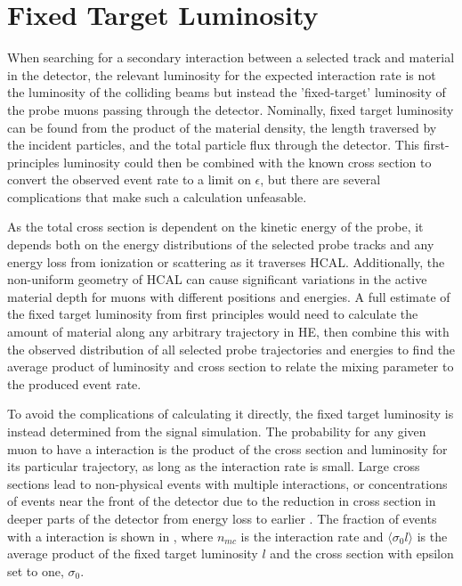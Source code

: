 \section{Fixed Target Luminosity}
\label{sec:fixedLumi}
When searching for a secondary interaction between a selected track and material in the detector, the relevant luminosity for the expected interaction rate is not the luminosity of the colliding beams but instead the 'fixed-target' luminosity of the probe muons passing through the detector.
Nominally, fixed target luminosity can be found from the product of the material density, the length traversed by the incident particles, and the total particle flux through the detector.
This first-principles luminosity could then be combined with the known \dbrem cross section to convert the observed event rate to a limit on $\epsilon$, but there are several complications that make such a calculation unfeasable.

As the total cross section is dependent on the kinetic energy of the probe, it depends both on the energy distributions of the selected probe tracks and any energy loss from ionization or scattering as it traverses HCAL.
Additionally, the non-uniform geometry of HCAL can cause significant variations in the active material depth for muons with different positions and energies. 
A full estimate of the fixed target luminosity from first principles would need to calculate the amount of material along any arbitrary trajectory in HE, then combine this with the observed distribution of all selected probe trajectories and energies to find the average product of luminosity and cross section to relate the mixing parameter to the produced event rate.

To avoid the complications of calculating it directly, the fixed target luminosity is instead determined from the signal simulation.
The probability for any given muon to have a \dbrem interaction is the product of the cross section and luminosity for its particular trajectory, as long as the interaction rate is small.
Large cross sections lead to non-physical events with multiple \dbrem interactions, or concentrations of \dbrem events near the front of the detector due to the reduction in cross section in deeper parts of the detector from energy loss to earlier \dbrem. 
The fraction of events with a \dbrem interaction is shown in , where $n_{mc}$ is the interaction rate and $\langle \sigma_0 l \rangle$ is the average product of the fixed target luminosity $l$ and the cross section with epsilon set to one, $\sigma_0$.  

